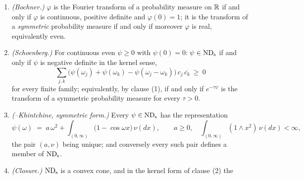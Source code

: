 \begin{proposition}\label{prop:fourier-toolbox}
\notready
{}
\begin{enumerate}
\item \emph{(Bochner.)} $\varphi$ is the Fourier transform of a probability measure on $\mathbb{R}$
if and only if $\varphi$ is continuous, positive definite and $\varphi(0) = 1$; it is the
transform of a \emph{symmetric} probability measure if and only if moreover $\varphi$ is real,
equivalently even.
\item \emph{(Schoenberg.)} For continuous even $\psi \ge 0$ with $\psi(0) = 0$: $\psi \in \mathrm{ND}_{\mathrm{s}}$
if and only if $\psi$ is negative definite in the kernel sense,
\[
  \sum_{j,k}\bigl(\psi(\omega_j) + \psi(\omega_k) - \psi(\omega_j - \omega_k)\bigr)\,
  c_j\,\overline{c_k} \ \ge\ 0
\]
for every finite family; equivalently, by clause (1), if and only if $e^{-\tau\psi}$ is the
transform of a symmetric probability measure for every $\tau > 0$.
\item \emph{(\Levy--Khintchine, symmetric form.)} Every $\psi \in \mathrm{ND}_{\mathrm{s}}$ has the representation
\begin{equation}\label{eq:levy-khintchine}
  \psi(\omega) \;=\; a\,\omega^2 + \int_{(0,\infty)} \bigl(1 - \cos\omega x\bigr)\,\nu(dx),
  \qquad a \ge 0, \quad \int_{(0,\infty)} (1 \wedge x^2)\,\nu(dx) < \infty,
\end{equation}
the pair $(a,\nu)$ being unique; and conversely every such pair defines a member of $\mathrm{ND}_{\mathrm{s}}$.
\item \emph{(Closure.)} $\mathrm{ND}_{\mathrm{s}}$ is a convex cone, and in the kernel form of clause (2) the

\end{enumerate}
\end{proposition}
